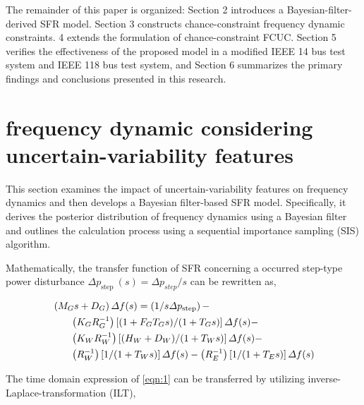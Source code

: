 \documentclass[lettersize,journal]{IEEEtran}
\begin{document}
The remainder of this paper is organized: Section {2} introduces a Bayesian-filter-derived SFR model. Section {3} constructs chance-constraint frequency dynamic constraints. {4} extends the
formulation of chance-constraint FCUC.  Section {5} verifies the effectiveness of the proposed model in a modified IEEE 14 bus test system and IEEE 118 bus test system, and Section {6} summarizes the primary findings and conclusions presented in this research.

\vspace{-0.125in} \section{frequency dynamic considering uncertain-variability features}

This section examines the impact of uncertain-variability features on frequency dynamics and then develops a Bayesian filter-based SFR model. Specifically, it derives the posterior distribution of
frequency dynamics using a Bayesian filter and outlines the calculation process using a sequential importance sampling (SIS) algorithm.

Mathematically, the transfer function of SFR concerning a occurred step-type power disturbance $\varDelta p_{\textrm{step }}(s)=\varDelta p_{{step }} / s$ can be rewritten as,

\vspace{-0.125in}
\begin{small}
	\begin{align}\label{eqn:1}
		 & \left(M_{G} s+D_{G}\right) \varDelta f(s)=\left({1/s} \varDelta p_{ \text{step}}\right)-                                                                          \\
		 & \qquad {\left({K_{G}}{ R_{G}^{-1}}\right)\left[ {\left(1+F_{G} T_{G} s\right)}/{\left(1+T_{G} s\right)}\right] \varDelta f(s)}- \notag                            \\
		 & \qquad {\left({K_W R_{W}^{-1}}\right)\left[{(H_W + D_W)}/{(1+T_{W} s)}\right] \varDelta f(s)} - \notag                                                            \\
		 & \qquad {\left({R_{W}^{-1}}\right)\left[{1}/({1+T_{W} s})\right] \varDelta f(s)} - {\left({R_{E}^{-1}}\right)\left[{1}/({1+T_{E} s})\right] \varDelta f(s)} \notag
	\end{align}
\end{small}

The time domain expression of \eqref{eqn:1} can be transferred by utilizing inverse-Laplace-transformation (ILT),
\end{document}
